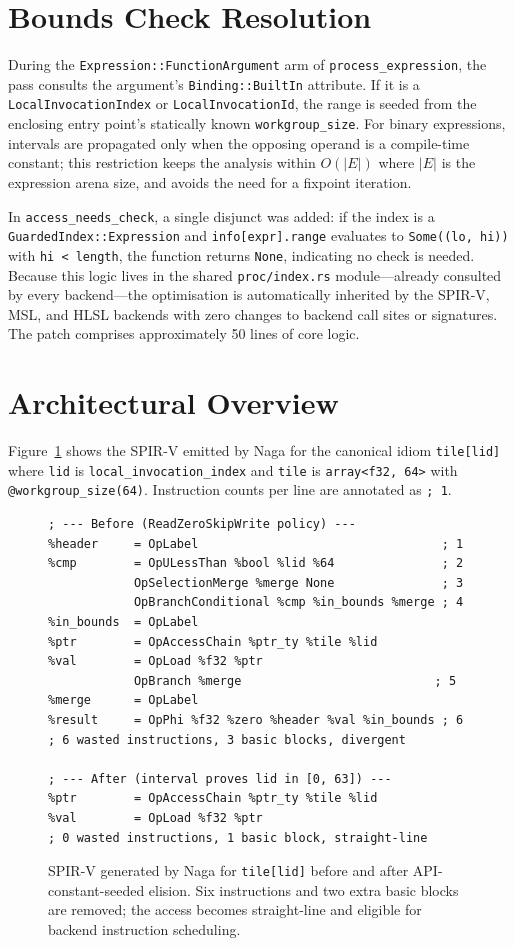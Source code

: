 \documentclass[10pt,a4paper,twocolumn]{article}
\begin{document}
\section{Bounds Check Resolution}

During the \texttt{Expression::FunctionArgument} arm of
\texttt{process\_expression}, the pass consults the argument's
\texttt{Binding::BuiltIn} attribute. If it is a \texttt{LocalInvocationIndex}
or \texttt{LocalInvocationId}, the range is seeded from the enclosing entry
point's statically known \texttt{workgroup\_size}. For binary expressions,
intervals are propagated only when the opposing operand is a compile-time
constant; this restriction keeps the analysis within $O(|E|)$ where $|E|$ is the
expression arena size, and avoids the need for a fixpoint iteration.

In \texttt{access\_needs\_check}, a single disjunct was added: if the index is
a \texttt{GuardedIndex::Expression} and \texttt{info[expr].range} evaluates to
\texttt{Some((lo, hi))} with \texttt{hi < length}, the function returns
\texttt{None}, indicating no check is needed. Because this logic lives in the
shared \texttt{proc/index.rs} module---already consulted by every backend---the
optimisation is automatically inherited by the SPIR-V, MSL, and HLSL backends
with zero changes to backend call sites or signatures. The patch comprises
approximately 50 lines of core logic.

\section{Architectural Overview}

Figure~\ref{fig:diff} shows the SPIR-V emitted by Naga for the canonical idiom
\texttt{tile[lid]} where \texttt{lid} is \texttt{local\_invocation\_index} and
\texttt{tile} is \texttt{array<f32, 64>} with \texttt{@workgroup\_size(64)}.
Instruction counts per line are annotated as \texttt{; 1}.

\begin{figure}[t]
\begin{lstlisting}
; --- Before (ReadZeroSkipWrite policy) ---
%header     = OpLabel                                  ; 1
%cmp        = OpULessThan %bool %lid %64               ; 2
            OpSelectionMerge %merge None               ; 3
            OpBranchConditional %cmp %in_bounds %merge ; 4
%in_bounds  = OpLabel
%ptr        = OpAccessChain %ptr_ty %tile %lid
%val        = OpLoad %f32 %ptr
            OpBranch %merge                           ; 5
%merge      = OpLabel
%result     = OpPhi %f32 %zero %header %val %in_bounds ; 6
; 6 wasted instructions, 3 basic blocks, divergent

; --- After (interval proves lid in [0, 63]) ---
%ptr        = OpAccessChain %ptr_ty %tile %lid
%val        = OpLoad %f32 %ptr
; 0 wasted instructions, 1 basic block, straight-line
\end{lstlisting}
\caption{SPIR-V generated by Naga for \texttt{tile[lid]} before and after
API-constant-seeded elision. Six instructions and two extra basic blocks are
removed; the access becomes straight-line and eligible for backend
instruction scheduling.}
\label{fig:diff}
\end{figure}
\end{document}
